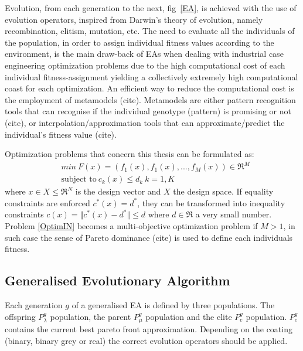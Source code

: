 Evolution, from each generation to the next, fig~\ref{EA}, is achieved with the use of evolution operators, inspired from Darwin's theory of evolution, namely recombination, elitism, mutation, etc. The need to evaluate all the individuals of the population, in order to assign individual fitness values according to the environment, is the main draw-back of EAs when dealing with industrial case engineering optimization problems due to the high computational cost of each individual fitness-assignment yielding a collectively extremely high computational coast for each optimization. An efficient way to reduce the computational cost is the employment of metamodels (cite). Metamodels are either pattern recognition tools that can recognise if the individual genotype (pattern) is promising or not (cite), or interpolation/approximation tools that can approximate/predict the individual's fitness value (cite).     


Optimization problems that concern this thesis can be formulated as:
\begin{align} 
   &min ~ F(x)=(f_1(x),f_1(x),...,f_M(x))\in \Re^{M} \nonumber \\
   &\mbox{subject to} ~ c_k(x)\leq d_k ~ k =1,K
\label{OptimIN}
\end{align}
where $x\in X \!\leq\! \Re^{N}$ is the design vector and $X$ the design space. If equality constraints are enforced $ c^*(x)=d^* $, they can be transformed into inequality constraints $ c(x)=\Vert c^*(x)-d^*\Vert \leq d $ where $ d \in \Re $ a very small number.  Problem \ref{OptimIN} becomes a multi-objective optimization problem if $M \!> \!1$, in such case the sense of Pareto dominance (cite) is used to define each individuals fitness. 
 
\subsection{Generalised Evolutionary Algorithm}

Each generation $g$ of a generalised EA is defined by three populations. The offspring $P_{\lambda}^g$ population, the parent $P_{\mu}^g$ population and the elite $P_{e}^g$ population. $P_{e}^g$ contains the current best pareto front approximation. Depending on the coating (binary, binary grey or real) the correct evolution operators should be applied. 

